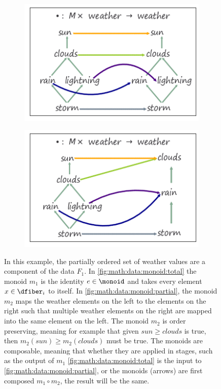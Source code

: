 \documentclass[../main.tex]{subfiles}
\begin{document}
\begin{figure}[H]
    \begin{subfigure}{.49\textwidth}
        \includegraphics[width=\textwidth]{figures/math/monoid_total.png}
        \caption{}
        \label{fig:math:data:monoid:total}
    \end{subfigure}
    \begin{subfigure}{.49\textwidth}
        \includegraphics[width=1\textwidth]{figures/math/monoid_partial.png}
        \caption{}
        \label{fig:math:data:monoid:partial}
    \end{subfigure}
    \caption{In this example, the partially ordered set of weather values are a component of the data $F_1$. In \autoref{fig:math:data:monoid:total} the monoid $m_1$ is the identity $e \in \monoid$ and takes every element $x \in \dfiber_i$ to itself. In \autoref{fig:math:data:monoid:partial}, the monoid $m_2$ maps the weather elements on the left to the elements on the right such that multiple weather elements on the right are mapped into the same element on the left. The monoid $m_2$ is order preserving, meaning for example that given $sun \geq clouds$ is true, then $m_2(sun) \geq m_2(clouds)$ must be true. The monoids are composable, meaning that whether they are applied in stages, such as the output of $m_1$ \autoref{fig:math:data:monoid:total} is the input to \autoref{fig:math:data:monoid:partial}, or the monoids (arrows) are first composed $m_1 \circ m_2$, the result will be the same.}
    \label{fig:math:data:monoid}
\end{figure}
\end{document}
